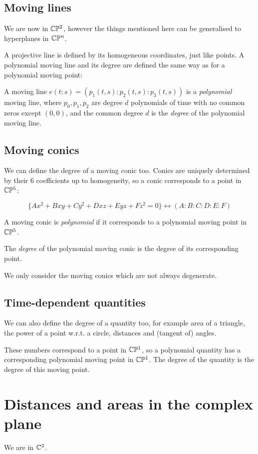 \documentclass[a4paper]{article}
\begin{document}

\subsection{Moving lines}

We are now in $\mathbb{C}\mathbb{P}^2$, however the things mentioned here can be generalised to hyperplanes in $\mathbb{C}\mathbb{P}^n$.

A projective line is defined by its homogeneous coordinates, just like points. A polynomial moving line and its degree are defined the same way as for a polynomial moving point:

A moving line $e(t:s)=(p_1(t,s):p_2(t,s):p_3(t,s))$ is a \textit{polynomial} moving line, where $p_0,p_1,p_2$ are degree $d$ polynomials of time with no common zeros except $(0,0)$, and the common degree $d$ is the \textit{degree} of the polynomial moving line.

\subsection{Moving conics}
We can define the degree of a moving conic too. Conics are uniquely determined by their 6 coefficients up to homogeneity, so a conic corresponds to a point in $\mathbb{C}\mathbb{P}^5$:

$$\{Ax^2+Bxy+Cy^2+Dxz+Eyz+Fz^2=0\} \leftrightarrow (A:B:C:D:E:F)$$

A moving conic is \textit{polynomial} if it corresponds to a polynomial moving point in $\mathbb{C}\mathbb{P}^5$.

The \textit{degree} of the polynomial moving conic is the degree of its corresponding point.

We only consider the moving conics which are not always degenerate.

\subsection{Time-dependent quantities}

We can also define the degree of a quantity too, for example area of a triangle, the power of a point w.r.t. a circle, distances and (tangent of) angles.

These numbers correspond to a point in $\mathbb{C}\mathbb{P}^1$, so a polynomial quantity has a corresponding polynomial moving point in $\mathbb{C}\mathbb{P}^1$. The degree of the quantity is the degree of this moving point.


\section{Distances and areas in the complex plane}
We are in $\mathbb{C}^2$.
\end{document}
